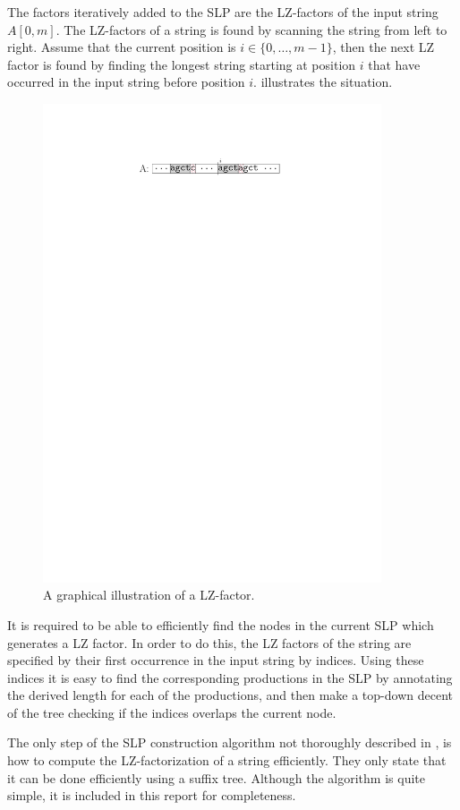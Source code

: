 \documentclass[twoside,11pt,openright]{report}
\newcommand{\str}[3]{#1[#2, #3]}
\begin{document}
The factors iteratively added to the SLP are the LZ-factors of the input string $\str{A}{0}{m}$. The LZ-factors of a string is found by scanning the string from left to right. Assume that the current position is $i \in \{0, \dots, m - 1\}$, then the next LZ factor is found by finding the longest string starting at position $i$ that have occurred in the input string before position $i$.  illustrates the situation.

\begin{figure}[!htb]
  \centering
  \includegraphics[width=10cm]{images/lz-factor}
  \caption{A graphical illustration of a LZ-factor.}
  \label{fig:lz-factor}
\end{figure}

It is required to be able to efficiently find the nodes in the current SLP which generates a LZ factor. In order to do this, the LZ factors of the string are specified by their first occurrence in the input string by indices. Using these indices it is easy to find the corresponding productions in the SLP by annotating the derived length for each of the productions, and then make a top-down decent of the tree checking if the indices overlaps the current node.

The only step of the SLP construction algorithm not thoroughly described in \cite{Rytter2003211}, is how to compute the LZ-factorization of a string efficiently. They only state that it can be done efficiently using a suffix tree. Although the algorithm is quite simple, it is included in this report for completeness.
\end{document}
